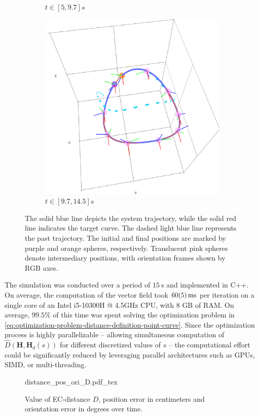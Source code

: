 \begin{figure}[ht!]
\begin{subfigure}[b]{0.32\textwidth}
        \caption{$t\in[5, 9.7]s$}
        \label{fig:vfplot-second}
    \end{subfigure}
    \hfill
    \begin{subfigure}[b]{0.32\textwidth}
        \centering
        \includegraphics[width=\textwidth]{figures/vf_automatica_3.pdf} %
        \caption{$t\in[9.7, 14.5]s$}
        \label{fig:vfplot-third}
    \end{subfigure}
    \caption{The solid blue line depicts the system trajectory, while the solid red line indicates the target curve. The dashed light blue line represents the past trajectory. The initial and final positions are marked by purple and orange spheres, respectively. Translucent pink spheres denote intermediary positions, with orientation frames shown by RGB axes.}
    \label{fig:vfplot-trajectory}
\end{figure}
The simulation was conducted over a period of $\qty{15}{\second}$ and implemented in C++. On average, the computation of the vector field took $\qty{60 \pm 5}{\milli\second}$ per iteration on a single core of an Intel i5-10300H @ 4.5GHz CPU, with 8 GB of RAM. On average, $99.5\%$ of this time was spent solving the optimization problem in \eqref{eq:optimization-problem-distance-definition-point-curve}. Since the optimization process is highly parallelizable -- allowing simultaneous computation of $\widehat{D}(\mathbf{H},\mathbf{H}_d(s))$ for different discretized values of $s$ -- the computational effort could be significantly reduced by leveraging parallel architectures such as GPUs, SIMD, or multi-threading.
\begin{figure}[ht!]
    \centering
    \def\svgwidth{.8\linewidth}
    {\tiny{distance_pos_ori_D.pdf_tex}}
    \caption{Value of EC-distance $D$, position error in centimeters and orientation error in degrees over time.}
    \label{fig:position-orientation-errors}
\end{figure}

